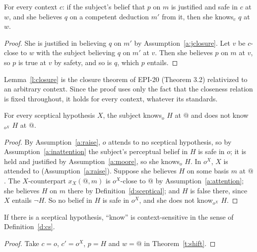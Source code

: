 \documentclass{situationist-preprint}
\begin{document}
\begin{lemma}\label{l:closure}
For every context $c$: if the subject's belief that $p$ on $m$ is justified and safe in $c$ at $w$, and she believes $q$ on a competent deduction $m'$ from it, then she knows$_c$ $q$ at $w$.
\end{lemma}

\begin{proof}
She is justified in believing $q$ on $m'$ by Assumption~\ref{a:jclosure}. Let $v$ be $c$-close to $w$ with the subject believing $q$ on $m'$ at $v$. Then she believes $p$ on $m$ at $v$, so $p$ is true at $v$ by safety, and so is $q$, which $p$ entails.
\end{proof}

Lemma~\ref{l:closure} is the closure theorem of EPI-20 (Theorem 3.2) relativized to an arbitrary context. Since the proof uses only the fact that the closeness relation is fixed throughout, it holds for every context, whatever its standards.

\begin{theorem}[Shift]\label{t:shift}
For every sceptical hypothesis $X$, the subject knows$_o$ $H$ at $@$ and does not know$_{o^X}$ $H$ at $@$.
\end{theorem}

\begin{proof}
By Assumption~\ref{a:raise}, $o$ attends to no sceptical hypothesis, so by Assumption~\ref{a:inattention} the subject's perceptual belief in $H$ is safe in $o$; it is held and justified by Assumption~\ref{a:moore}, so she knows$_o$ $H$. In $o^X$, $X$ is attended to (Assumption~\ref{a:raise}). Suppose she believes $H$ on some basis $m$ at $@$. The $X$-counterpart $x_X(@,m)$ is $o^X$-close to $@$ by Assumption~\ref{a:attention}; she believes $H$ on $m$ there by Definition~\ref{d:sceptical}; and $H$ is false there, since $X$ entails $\neg H$. So no belief in $H$ is safe in $o^X$, and she does not know$_{o^X}$ $H$.
\end{proof}

\begin{corollary}\label{c:cs}
If there is a sceptical hypothesis, \enquote{know} is context-sensitive in the sense of Definition~\ref{d:cs}.
\end{corollary}

\begin{proof}
Take $c = o$, $c' = o^X$, $p = H$ and $w = @$ in Theorem~\ref{t:shift}.
\end{proof}
\end{document}
